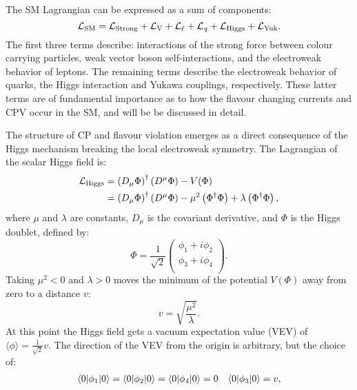 The SM Lagrangian can be expressed as a sum of components:
\begin{equation}
  \mathcal{L}_\mathrm{SM} = \mathcal{L}_\mathrm{Strong} + \mathcal{L}_\mathrm{V} + \mathcal{L}_\mathrm{\ell} + \mathcal{L}_\mathrm{\it q} + \mathcal{L}_\mathrm{Higgs} + \mathcal{L}_\mathrm{Yuk}.
  \label{eq:th:lag}
\end{equation}
The first three terms describe: interactions of the strong force between colour carrying particles,
weak vector boson self-interactions, and the electroweak behavior of leptons.
The remaining terms describe the electroweak behavior of quarks, the Higgs interaction and Yukawa
couplings, respectively.
These latter terms are of fundamental importance as to how the flavour changing currents and CPV
occur in the SM, and will be be discussed in detail.

The structure of CP and flavour violation emerges as a direct consequence of the Higgs mechanism
breaking the local electroweak symmetry.
The Lagrangian of the scalar Higgs field is:
\begin{align}
  \mathcal{L}_\mathrm{Higgs}
  &= \left(D_\mu\Phi\right)^\dagger\left(D^\mu\Phi\right) - V(\Phi) \\
  &= \left(D_\mu\Phi\right)^\dagger\left(D^\mu\Phi\right) - \mu^2\left(\Phi^\dagger\Phi\right) +
  \lambda\left(\Phi^\dagger\Phi\right),
  \label{eq:th:laghiggs1}
\end{align}
where $\mu$ and $\lambda$ are constants, $D_\mu$ is the covariant derivative, and $\Phi$ is the
Higgs doublet, defined by:
\begin{equation}
  \Phi = \frac{1}{\sqrt{2}}
  \begin{pmatrix}
    \phi_1 + i\phi_2 \\
    \phi_3 + i\phi_4 \\
  \end{pmatrix}.
  \label{eq:th:phi}
\end{equation}
Taking $\mu^2<0$ and $\lambda>0$ moves the minimum of the potential $V(\Phi)$ away from zero to a distance $v$:
\begin{equation}
  v = \sqrt{\frac{\mu^2}{\lambda}}.
\end{equation}
At this point the Higgs field gets a vacuum expectation value (VEV)
of $\langle\phi\rangle = \tfrac{1}{\sqrt{2}}v$.
The direction of the VEV from the origin is arbitrary, but the choice of:
\begin{align}
  \langle 0|\phi_1|0\rangle =
  \langle 0|\phi_2|0\rangle =
  \langle 0|\phi_4|0\rangle = 0  &&
  \langle 0|\phi_3|0\rangle = v,
\end{align}

